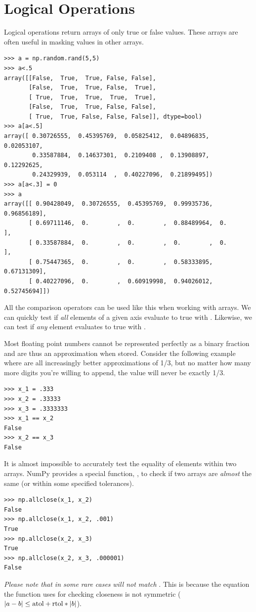 \section*{Logical Operations} 
Logical operations return arrays of only true or false values. 
These arrays are often useful in masking values in other arrays. 

\begin{lstlisting}
>>> a = np.random.rand(5,5) 
>>> a<.5
array([[False,  True,  True, False, False],
       [False,  True,  True, False,  True],
       [ True,  True,  True,  True,  True],
       [False,  True,  True, False, False],
       [ True,  True, False, False, False]], dtype=bool)
>>> a[a<.5]
array([ 0.30726555,  0.45395769,  0.05825412,  0.04896835,  0.02053107,
        0.33587884,  0.14637301,  0.2109408 ,  0.13908897,  0.12292625,
        0.24329939,  0.053114  ,  0.40227096,  0.21899495])
>>> a[a<.3] = 0 
>>> a
array([[ 0.90428049,  0.30726555,  0.45395769,  0.99935736,  0.96856189],
       [ 0.69711146,  0.        ,  0.        ,  0.88489964,  0.        ],
       [ 0.33587884,  0.        ,  0.        ,  0.        ,  0.        ],
       [ 0.75447365,  0.        ,  0.        ,  0.58333895,  0.67131309],
       [ 0.40227096,  0.        ,  0.60919998,  0.94026012,  0.52745694]])
\end{lstlisting} 
All the comparison operators can be used like this when working with arrays. 
We can quickly test if \emph{all} elements of a given axis
evaluate to true with .  
Likewise, we can test if \emph{any} element evaluates to true with 
. 

Most floating point numbers cannot be represented perfectly 
as a binary fraction and are thus an approximation when stored. 
Consider the following example where  are all 
increasingly better approximations of 1/3, but no matter how
many more digits you're willing to append, the value will never be 
exactly 1/3. 
\begin{lstlisting}
>>> x_1 = .333
>>> x_2 = .33333
>>> x_3 = .3333333 
>>> x_1 == x_2
False
>>> x_2 == x_3
False
\end{lstlisting}
It is almost impossible to accurately test the equality
of elements within two arrays. NumPy provides a special function,
, to check if two arrays are \emph{almost} the same (or
within some specified tolerances). 
\begin {lstlisting}
>>> np.allclose(x_1, x_2)
False
>>> np.allclose(x_1, x_2, .001)
True
>>> np.allclose(x_2, x_3)
True
>>> np.allclose(x_2, x_3, .000001)
False
\end{lstlisting}
\emph{Please note that in some rare
cases}  \emph{will not match} . This is because the equation the function uses for checking
closeness is not symmetric ($\left\lvert a-b\right\rvert \leq \mbox{atol} +
\mbox{rtol}*\left\lvert b\right\rvert$). 

